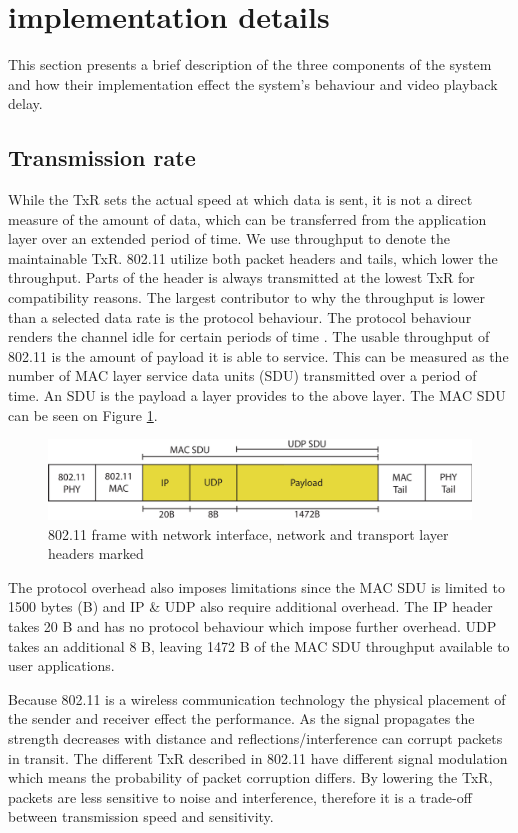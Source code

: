 \section{implementation details}\label{sec:impl}
This section presents a brief description of the three components of the system and how their implementation effect the system's behaviour and video playback delay.
\subsection{Transmission rate}
While the TxR sets the actual speed at which data is sent, it is not a direct measure of the amount of data, which can be transferred from the application layer over an extended period of time. We use throughput to denote the maintainable TxR. 802.11 utilize both packet headers and tails, which lower the throughput. Parts of the header is always transmitted at the lowest TxR for compatibility reasons. The largest contributor to why the throughput is lower than a selected data rate is the protocol behaviour. The protocol behaviour renders the channel idle for certain periods of time \cite{WorksheetThroughput,Throughput80211}. The usable throughput of 802.11 is the amount of payload it is able to service. This can be measured as the number of MAC layer service data units (SDU) transmitted over a period of time. An SDU is the payload a layer provides to the above layer. The MAC SDU can be seen on Figure \ref{fig:headers}.
\begin{figure}[ht]
  \centering
  \includegraphics[width=\linewidth]{images/headers.pdf}
  \caption{802.11 frame with network interface, network and transport layer headers marked}
  \label{fig:headers}
\end{figure}

The protocol overhead also imposes limitations since the MAC SDU is limited to 1500 bytes (B) and IP \& UDP also require additional overhead. The IP header takes 20 B and has no protocol behaviour which impose further overhead. UDP takes an additional 8 B, leaving 1472 B of the MAC SDU throughput available to user applications.

Because 802.11 is a wireless communication technology the physical placement of the sender and receiver effect the performance. As the signal propagates the strength decreases with distance and reflections/interference can corrupt packets in transit. The different TxR described in 802.11 have different signal modulation which means the probability of packet corruption differs. By lowering the TxR, packets are less sensitive to noise and interference, therefore it is a trade-off between transmission speed and sensitivity.

